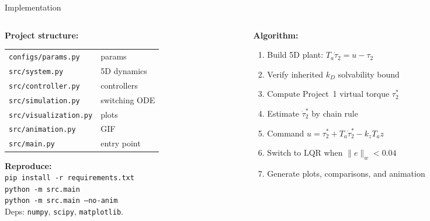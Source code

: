 \documentclass[aspectratio=169, 12pt]{beamer}
\begin{document}
\begin{frame}{Implementation}
\footnotesize
\begin{columns}[T]
\begin{column}{0.43\textwidth}
  \textbf{Project structure:}

  \smallskip
  {\scriptsize
  \begin{tabular}{@{}l@{\;\;---\;\;}l@{}}
    \texttt{configs/params.py}    & params \\
    \texttt{src/system.py}        & 5D dynamics \\
    \texttt{src/controller.py}    & controllers \\
    \texttt{src/simulation.py}    & switching ODE \\
    \texttt{src/visualization.py} & plots \\
    \texttt{src/animation.py}     & GIF \\
    \texttt{src/main.py}          & entry point \\
  \end{tabular}
  }

  \medskip
  \textbf{Reproduce:}\\[2pt]
  {\scriptsize
  \texttt{pip install -r requirements.txt}\\
  \texttt{python -m src.main}\\
  \texttt{python -m src.main --no-anim}\\[2pt]
  }
  Deps: \texttt{numpy}, \texttt{scipy}, \texttt{matplotlib}.
\end{column}
\begin{column}{0.53\textwidth}
  \textbf{Algorithm:}
  {\scriptsize
  \begin{enumerate}\setlength\itemsep{1pt}
    \item Build 5D plant: $T_a\dot{\tau}_2 = u-\tau_2$
    \item Verify inherited $k_D$ solvability bound
    \item Compute Project~1 virtual torque $\tau_2^\ast$
    \item Estimate $\dot{\tau}_2^\ast$ by chain rule
    \item Command $u=\tau_2^\ast+T_a\dot{\tau}_2^\ast-k_zT_az$
    \item Switch to LQR when $\|e\|_w < 0.04$
    \item Generate plots, comparisons, and animation
  \end{enumerate}
  }

\end{column}
\end{columns}
\end{frame}
\end{document}
